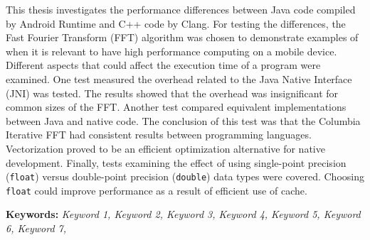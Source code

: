 This thesis investigates the performance differences between Java code compiled by Android Runtime and C++ code by Clang. For testing the differences, the Fast Fourier Transform (FFT) algorithm was chosen to demonstrate examples of when it is relevant to have high performance computing on a mobile device. Different aspects that could affect the execution time of a program were examined. One test measured the overhead related to the Java Native Interface (JNI) was tested. The results showed that the overhead was insignificant for common sizes of the FFT. Another test compared equivalent implementations between Java and native code. The conclusion of this test was that the Columbia Iterative FFT had consistent results between programming languages. Vectorization proved to be an efficient optimization alternative for native development. Finally, tests examining the effect of using single-point precision (\texttt{float}) versus double-point precision (\texttt{double}) data types were covered. Choosing \texttt{float} could improve performance as a result of efficient use of cache.


\textbf{Keywords:} \emph{Keyword 1, Keyword 2, Keyword 3, Keyword 4, Keyword 5, Keyword 6, Keyword 7, }
